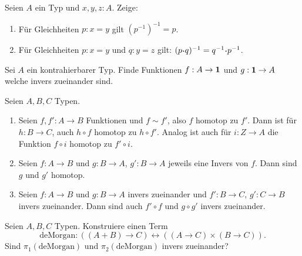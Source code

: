 \documentclass{uebung}
\begin{document}

\begin{exercise}
  Seien $A$ ein Typ und $x,y,z:A$. Zeige:
  \begin{enumerate}
  \item Für Gleichheiten $p:x=y$ gilt $\left(p^{-1}\right)^{-1}=p$.
  \item Für Gleichheiten $p:x=y$ und $q:y=z$ gilt: $(p\kon q)^{-1}=q^{-1}\kon p^{-1}$.
  \end{enumerate}
\end{exercise}

\begin{exercise}
  Sei $A$ ein kontrahierbarer Typ.
  Finde Funktionen $f:A\to\mathbf{1}$ und $g:\mathbf{1}\to A$ welche invers zueinander sind.
\end{exercise}

\begin{exercise}
  Seien $A,B,C$ Typen.
  \begin{enumerate}
  \item Seien $f,f':A\to B$ Funktionen und $f\sim f'$, also $f$ homotop zu $f'$.
    Dann ist für $h:B\to C$, auch $h\circ f$ homotop zu $h\circ f'$.
    Analog ist auch für $i:Z\to A$ die Funktion $f\circ i$ homotop zu $f'\circ i$.
  \item Seien $f:A\to B$ und $g:B\to A$, $g':B\to A$ jeweils eine Invers von $f$.
    Dann sind $g$ und $g'$ homotop.
  \item Seien $f:A\to B$ und $g:B\to A$ invers zueinander und $f':B\to C$, $g':C\to B$ invers zueinander.
    Dann sind auch $f'\circ f$ und $g\circ g'$ invers zueinander.
  \end{enumerate}
\end{exercise}

\begin{exercise}
  Seien $A,B,C$ Typen.
  Konstruiere einen Term 
  \begin{equation*}
    \mathrm{deMorgan}:((A+B)\to C) \leftrightarrow ((A\to C)\times (B\to C)).
  \end{equation*}
  Sind $\pi_1(\mathrm{deMorgan})$ und $\pi_2(\mathrm{deMorgan})$ invers zueinander?
\end{exercise}
\end{document}
